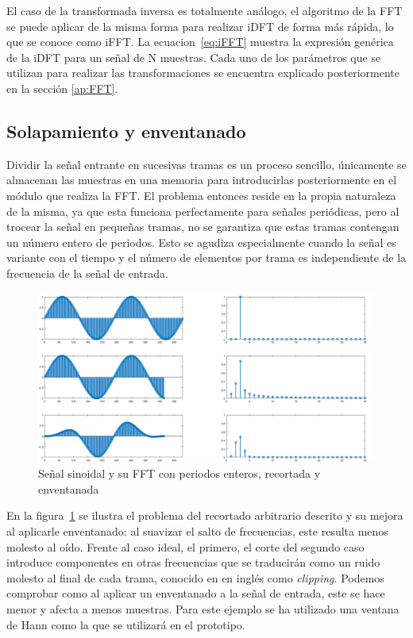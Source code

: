 El caso de la transformada inversa es totalmente análogo, el algoritmo de la FFT se puede aplicar de la misma forma para realizar iDFT de forma más rápida, lo que se conoce como iFFT. La ecuacion~\ref{eq:iFFT} muestra la expresión genérica de la iDFT para un señal de N muestras. Cada uno de los parámetros que se utilizan para realizar las transformaciones se encuentra explicado posteriormente en la sección \ref{ap:FFT}.

\subsection{Solapamiento y enventanado}

Dividir la señal entrante en sucesivas tramas es un proceso sencillo, únicamente se almacenan las muestras en una memoria para introducirlas posteriormente en el módulo que realiza la FFT. El problema entonces reside en la propia naturaleza de la misma, ya que esta funciona perfectamente para señales periódicas, pero al trocear la señal en pequeñas tramas, no se garantiza que estas tramas contengan un número entero de periodos. Esto se agudiza especialmente cuando la señal es variante con el tiempo y el número de elementos por trama es independiente de la frecuencia de la señal de entrada.

\begin{figure}[!ht]
\begin{center}
\includegraphics[width=14cm]{img/problem_fft.png}
\caption{\label{fig:probfft}Señal sinoidal y su FFT con periodos enteros, recortada y enventanada}
\end{center}
\end{figure}

En la figura~\ref{fig:probfft} se ilustra el problema del recortado arbitrario descrito y su mejora al aplicarle enventanado: al suavizar el salto de frecuencias, este resulta menos molesto al oído. Frente al caso ideal, el primero, el corte del segundo caso introduce componentes en otras frecuencias que se traducirán como un ruido molesto al final de cada trama, conocido en en inglés como \emph{clipping}. Podemos comprobar como al aplicar un enventanado a la señal de entrada, este se hace menor y afecta a menos muestras. Para este ejemplo se ha utilizado una ventana de Hann como la que se utilizará en el prototipo.

